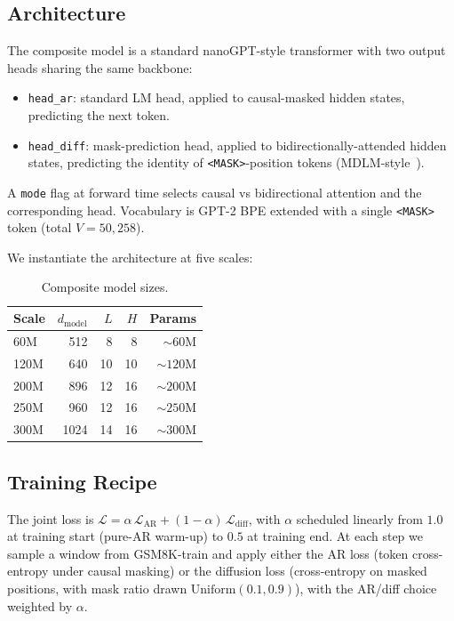 \subsection{Architecture}

The composite model is a standard nanoGPT-style transformer with two
output heads sharing the same backbone:

\begin{itemize}
  \item \texttt{head\_ar}: standard LM head, applied to causal-masked
        hidden states, predicting the next token.
  \item \texttt{head\_diff}: mask-prediction head, applied to
        bidirectionally-attended hidden states, predicting the
        identity of \texttt{<MASK>}-position tokens
        (MDLM-style~\citep{sahoo2024simple}).
\end{itemize}

A \texttt{mode} flag at forward time selects causal vs bidirectional
attention and the corresponding head. Vocabulary is GPT-2 BPE
\citep{radford2019gpt2} extended with a single \texttt{<MASK>} token
(total $V=50{,}258$).

We instantiate the architecture at five scales:

\begin{table}[h]
\centering
\begin{tabular}{lrrrr}
\toprule
Scale & $d_{\text{model}}$ & $L$ & $H$ & Params \\
\midrule
60M  & 512  & 8  & 8  & $\sim 60$M  \\
120M & 640  & 10 & 10 & $\sim 120$M \\
200M & 896  & 12 & 16 & $\sim 200$M \\
250M & 960  & 12 & 16 & $\sim 250$M \\
300M & 1024 & 14 & 16 & $\sim 300$M \\
\bottomrule
\end{tabular}
\caption{Composite model sizes.}
\end{table}

\subsection{Training Recipe}

The joint loss is $\mathcal{L} = \alpha\,\mathcal{L}_{\text{AR}} +
(1-\alpha)\,\mathcal{L}_{\text{diff}}$, with $\alpha$ scheduled linearly
from $1.0$ at training start (pure-AR warm-up) to $0.5$ at training
end. At each step we sample a window from GSM8K-train and apply
either the AR loss (token cross-entropy under causal masking) or the
diffusion loss (cross-entropy on masked positions, with mask ratio
drawn $\text{Uniform}(0.1, 0.9)$), with the AR/diff choice weighted by
$\alpha$.

